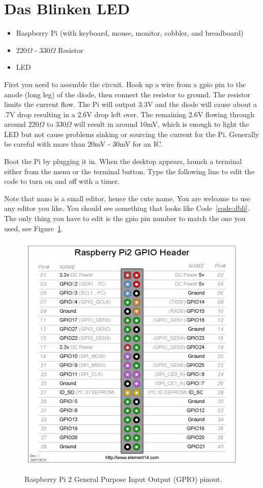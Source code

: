 \section{Das Blinken LED}

\begin{itemize}
  \item Raspberry Pi (with keyboard, mouse, monitor, cobbler, and breadboard)
  \item 220$\Omega$ - 330$\Omega$ Resistor
  \item LED
\end{itemize}

First you need to assemble the circuit.  Hook up a wire from a gpio pin to the anode (long leg) of the diode, then connect the resistor to ground.  The resistor limits the current flow.  The Pi will output 3.3V and the diode will cause about a .7V drop resulting in a 2.6V drop left over.  The remaining 2.6V flowing through around 220$\Omega$ to 330$\Omega$ will result in around 10mV, which is enough to light the LED but not cause problems sinking or sourcing the current for the Pi.  Generally be careful with more than 20mV - 30mV for an IC.

Boot the Pi by plugging it in.  When the desktop appears, launch a terminal either from the menu or the terminal button.  Type the following line to edit the code to turn on and off with a timer.


Note that nano is a small editor, hence the cute name.  You are welcome to use any editor you like.  You should see something that looks like Code~\ref{code:dbli}.  The only thing you have to edit is the gpio pin number to match the one you used, see Figure~\ref{fig:RPiGPIO}.

\begin{figure}\begin{center}
\caption{Raspberry Pi 2 General Purpose Input Output (GPIO) pinout.}\label{fig:RPiGPIO}
\includegraphics[width=.7\textwidth]{../images/GPIO_Pi2.png}
\end{center}\end{figure}

